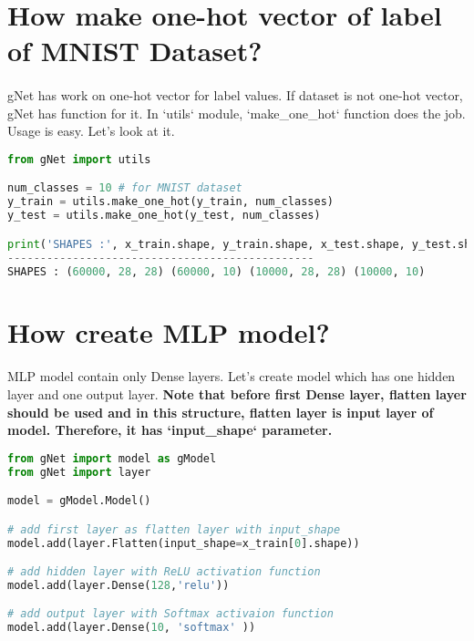 \documentclass[12pt]{report}
\begin{document}
\section{How make one-hot vector of label of MNIST Dataset?}
\paragraph{}
gNet has work on one-hot vector for label values. If dataset is not one-hot vector, gNet has function for it. In `utils` module, `make\_one\_hot` function does the job. Usage is easy. Let's look at it.

\begin{lstlisting}[language=Python, numbers=none, caption={Making one-hot vector of label of dataset.}, label={ex:make-one-hot}]
from gNet import utils

num_classes = 10 # for MNIST dataset
y_train = utils.make_one_hot(y_train, num_classes)
y_test = utils.make_one_hot(y_test, num_classes)

print('SHAPES :', x_train.shape, y_train.shape, x_test.shape, y_test.shape)
-----------------------------------------------
SHAPES : (60000, 28, 28) (60000, 10) (10000, 28, 28) (10000, 10)
\end{lstlisting}



\section{How create MLP model?}
\paragraph{}
MLP model contain only Dense layers. Let's create model which has one hidden layer and one output layer. \textbf{Note that before first Dense layer, flatten layer should be used and in this structure, flatten layer is input layer of model. Therefore, it has `input\_shape` parameter.}


\begin{lstlisting}[language=Python, numbers=none, caption={Create MLP model.}, label={ex:create-mlp-model}]
from gNet import model as gModel
from gNet import layer

model = gModel.Model()

# add first layer as flatten layer with input_shape
model.add(layer.Flatten(input_shape=x_train[0].shape))

# add hidden layer with ReLU activation function
model.add(layer.Dense(128,'relu'))

# add output layer with Softmax activaion function 
model.add(layer.Dense(10, 'softmax' ))
\end{lstlisting}
\end{document}
